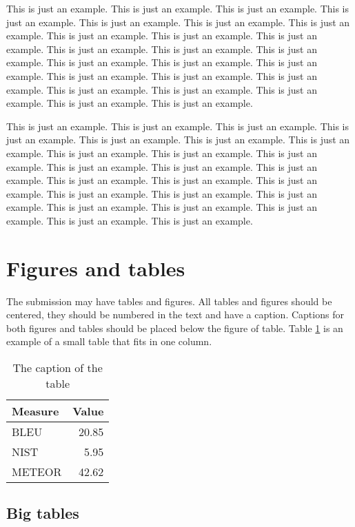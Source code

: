 \documentclass[10pt, a4paper]{article}
\begin{document}
This is just an example. This is just an example. This is just an example. This is just an example. This is just an example. This is just an example. This is just an example. This is just an example. This is just an example. This is just an example. This is just an example. This is just an example. This is just an example. This is just an example. This is just an example. This is just an example. This is just an example. This is just an example. This is just an example. This is just an example. This is just an example. This is just an example. This is just an example. This is just an example.

This is just an example. This is just an example. This is just an example. This is just an example. This is just an example. This is just an example. This is just an example. This is just an example. This is just an example. This is just an example. This is just an example. This is just an example. This is just an example. This is just an example. This is just an example. This is just an example. This is just an example. This is just an example. This is just an example. This is just an example. This is just an example. This is just an example. This is just an example. This is just an example.

\section{Figures and tables}


The submission may have tables and figures. All tables and figures should be centered, they should be numbered in the text and have a caption. Captions for both figures and tables should be placed below the figure of table.
Table \ref{tab:label1} is an example of a small table that fits in one column.

\begin{table}
  \centering
    \begin{tabular}{ l r}
      \hline
      {\bf Measure} & {\bf Value}\\ \hline
      BLEU & 20.85 \\ 
      NIST & 5.95 \\ 
      METEOR & 42.62 \\
      \hline
    \end{tabular}
    \caption{The caption of the table}
    \label{tab:label1}
\end{table}


\subsection{Big tables}
\end{document}
